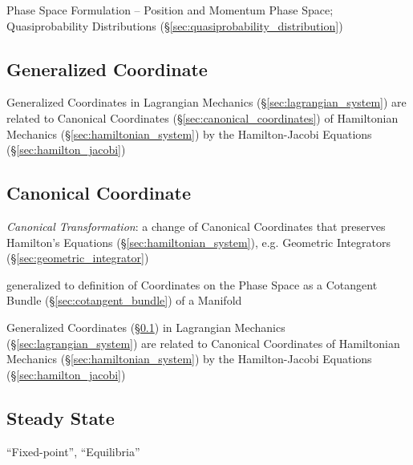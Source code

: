 Phase Space Formulation -- Position and Momentum Phase Space; Quasiprobability
Distributions (\S\ref{sec:quasiprobability_distribution})



\subsection{Generalized Coordinate}\label{sec:generalized_coordinate}

Generalized Coordinates in Lagrangian Mechanics (\S\ref{sec:lagrangian_system})
are related to Canonical Coordinates (\S\ref{sec:canonical_coordinates}) of
Hamiltonian Mechanics (\S\ref{sec:hamiltonian_system}) by the Hamilton-Jacobi
Equations (\S\ref{sec:hamilton_jacobi})



\subsection{Canonical Coordinate}\label{sec:canonical_coordinate}

\emph{Canonical Transformation}: a change of Canonical Coordinates that
preserves Hamilton's Equations (\S\ref{sec:hamiltonian_system}), e.g. Geometric
Integrators (\S\ref{sec:geometric_integrator})

generalized to definition of Coordinates on the Phase Space as a Cotangent
Bundle (\S\ref{sec:cotangent_bundle}) of a Manifold

Generalized Coordinates (\S\ref{sec:generalized_coordinate}) in Lagrangian
Mechanics (\S\ref{sec:lagrangian_system}) are related to Canonical Coordinates
of Hamiltonian Mechanics (\S\ref{sec:hamiltonian_system}) by the
Hamilton-Jacobi Equations (\S\ref{sec:hamilton_jacobi})



\subsection{Steady State}\label{sec:steady_state}

``Fixed-point'', ``Equilibria'' %

